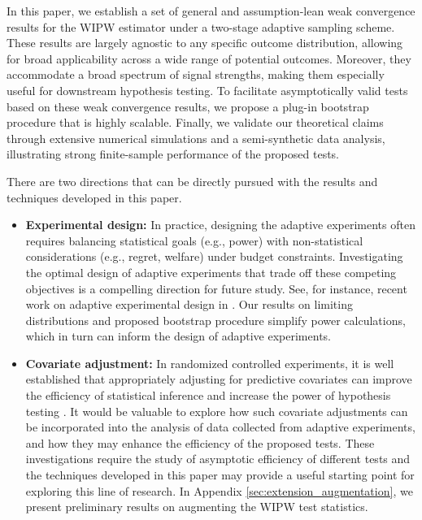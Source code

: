 \documentclass[12pt]{article}
\begin{document}
In this paper, we establish a set of general and assumption-lean weak convergence results for the WIPW estimator under a two-stage adaptive sampling scheme. These results are largely agnostic to any specific outcome distribution, allowing for broad applicability across a wide range of potential outcomes. Moreover, they accommodate a broad spectrum of signal strengths, making them especially useful for downstream hypothesis testing. To facilitate asymptotically valid tests based on these weak convergence results, we propose a plug-in bootstrap procedure that is highly scalable. Finally, we validate our theoretical claims through extensive numerical simulations and a semi-synthetic data analysis, illustrating strong finite-sample performance of the proposed tests. 

There are two directions that can be directly pursued with the results and techniques developed in this paper.
\begin{itemize}
	\item \textbf{Experimental design:} In practice, designing the adaptive experiments often requires balancing statistical goals (e.g., power) with non-statistical considerations (e.g., regret, welfare) under budget constraints. Investigating the optimal design of adaptive experiments that trade off these competing objectives is a compelling direction for future study. See, for instance, recent work on adaptive experimental design in \citet{che2023adaptive,liang2023experimental,simchi2023multi,li2024double}. Our results on limiting distributions and proposed bootstrap procedure simplify power calculations, which in turn can inform the design of adaptive experiments. 
	
	\item \textbf{Covariate adjustment:} In randomized controlled experiments, it is well established that appropriately adjusting for predictive covariates can improve the efficiency of statistical inference and increase the power of hypothesis testing \citep{lin2013agnostic}. It would be valuable to explore how such covariate adjustments can be incorporated into the analysis of data collected from adaptive experiments, and how they may enhance the efficiency of the proposed tests. These investigations require the study of asymptotic efficiency of different tests and the techniques developed in this paper may provide a useful starting point for exploring this line of research. In Appendix \ref{sec:extension_augmentation}, we present preliminary results on augmenting the WIPW test statistics.
\end{itemize}
\end{document}
